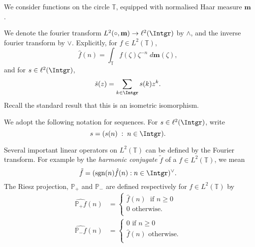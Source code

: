 \documentclass{unswmaths}
\begin{document}
\subject{}
\author{}
\title{}
\studentno{}


\newcommand{\Real}{\operatorname{Re}}
\newcommand{\Img}{\operatorname{Im}}
\newcommand{\lan}{\langle}
\newcommand{\ran}{\rangle}
\newcommand{\Proj}{\mathbb{P}}
\newcommand{\isom}{\cong}
\newcommand{\id}{{\operatorname{id}}}
\newcommand{\ha}{\mathbf{m}}
\newcommand{\Circ}{\mathbb{T}}
\newcommand{\BMO}{{BMO}}
\newcommand{\sgn}{\operatorname{sgn}}
\newcommand{\Diff}{\mathcal{D}}


We consider functions on the circle $\Circ$, equipped
with normalised Haar measure $\ha$.

We denote the fourier transform $L^2(\circ,\ha) \rightarrow \ell^2(\Intgr)$ 
by $\wedge$, and the inverse fourier transform by $\vee$. Explicitly,
for $f \in L^2(\Circ)$, 
\begin{equation*}
    \hat{f}(n) = \int_{\Circ} f(\zeta)\zeta^{-n}\;d\ha(\zeta),
\end{equation*}
and for $s \in \ell^2(\Intgr)$,
\begin{equation*}
    \check{s}(z) = \sum_{k \in \Intgr} s(k)z^k.
\end{equation*}
Recall the standard result that this is an isometric isomorphism.

We adopt the following notation for sequences. For $s \in \ell^2(\Intgr)$, write
\begin{equation*}
    s = (s(n)\;:\;n \in \Intgr).
\end{equation*}

Several important linear operators on $L^2(\Circ)$ can be defined by the Fourier
transform. For example by the \emph{harmonic conjugate} $\tilde{f}$ of a $f \in L^2(\Circ)$, we mean
\begin{equation*}
    \tilde{f} = (\sgn(n)\hat{f}(n):n \in \Intgr)^{\vee}.
\end{equation*}
The Riesz projection, $\Proj_+$ and $\Proj_-$ are defined respectively for $f \in L^2(\Circ)$ by
\begin{align*}
        \widehat{\Proj_+ f}(n) &= \begin{cases} \hat{f}(n)\;\text{ if }n \geq 0\\
        0\text{ otherwise.}\\
   \end{cases}\\
   \widehat{\Proj_- f}(n) &= \begin{cases} 0\text{ if }n \geq 0\\
        \hat{f}(n)\text{ otherwise.}\\
   \end{cases}
\end{align*}
\end{document}
